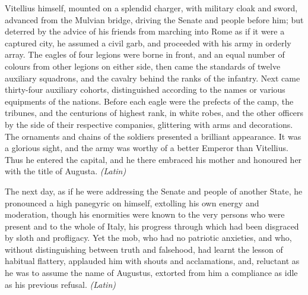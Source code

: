 
Vitellius himself, mounted on a splendid charger, with military cloak and sword, advanced from the Mulvian bridge, driving the Senate and people before him; but deterred by the advice of his friends from marching into Rome as if it were a captured city, he assumed a civil garb, and proceeded with his army in orderly array. The eagles of four legions were borne in front, and an equal number of colours from other legions on either side, then came the standards of twelve auxiliary squadrons, and the cavalry behind the ranks of the infantry. Next came thirty-four auxiliary cohorts, distinguished according to the names or various equipments of the nations. Before each eagle were the prefects of the camp, the tribunes, and the centurions of highest rank, in white robes, and the other officers by the side of their respective companies, glittering with arms and decorations. The ornaments and chains of the soldiers presented a brilliant appearance. It was a glorious sight, and the army was worthy of a better Emperor than Vitellius. Thus he entered the capital, and he there embraced his mother and honoured her with the title of Augusta. \emph{(Latin)}


The next day, as if he were addressing the Senate and people of another State, he pronounced a high panegyric on himself, extolling his own energy and moderation, though his enormities were known to the very persons who were present and to the whole of Italy, his progress through which had been disgraced by sloth and profligacy. Yet the mob, who had no patriotic anxieties, and who, without distinguishing between truth and falsehood, had learnt the lesson of habitual flattery, applauded him with shouts and acclamations, and, reluctant as he was to assume the name of Augustus, extorted from him a compliance as idle as his previous refusal. \emph{(Latin)}


